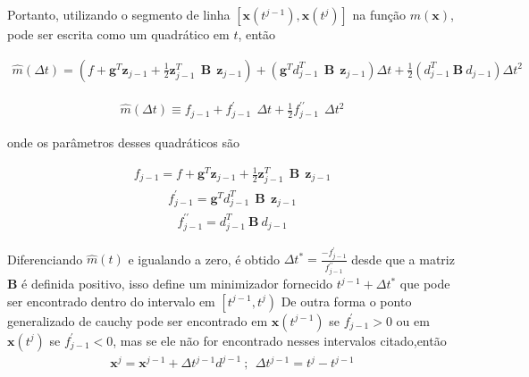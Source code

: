           
          Portanto, utilizando o segmento de linha $\left [ \mathbf{x}\left(t^{j-1}\right),\mathbf{x}\left(t^{j}\right) \right] $ na função $m(\mathbf{x})$, pode ser escrita como um quadrático em $t$, então
          
          \begin{eqnarray}
          \nonumber
          \hat{m}\left(\Delta t\right) = \left(f + \mathbf{g}^{T} \mathbf{z}_{j-1} + \frac{1}{2} \mathbf{z}_{j-1} ^{T}~~\mathbf{B}~~\mathbf{z}_{j-1}\right) + \left(\mathbf{g}^{T} d_{j-1}^T~~\mathbf{B}~~\mathbf{z}_{j-1}\right) \Delta t + \frac{1}{2} \left(d_{j-1}^{T}~\mathbf{B}~d_{j-1}\right) \Delta t^{2}
          \end{eqnarray}

          \begin{eqnarray}
           \hat{m}\left(\Delta t\right) \equiv f_{j-1} + f^{\prime}_{j-1}~~ \Delta t + \frac{1}{2} f^{\prime \prime}_{j-1} ~~\Delta t^{2}
           \end{eqnarray}
 
          onde os parâmetros desses quadráticos são
          
          \begin{eqnarray}
          \nonumber
          f_{j-1} = f + \mathbf{g}^{T} \mathbf{z}_{j-1} + \frac{1}{2} \mathbf{z}_{j-1} ^{T}~~\mathbf{B}~~\mathbf{z}_{j-1}
          \end{eqnarray}
          \begin{eqnarray}
           f^{\prime}_{j-1}=\mathbf{g}^{T} d_{j-1}^T~~\mathbf{B}~~\mathbf{z}_{j-1}
           \label{fprime}
          \end{eqnarray}
          \begin{eqnarray}
          f^{\prime \prime}_{j-1} =d_{j-1}^{T}~\mathbf{B}~d_{j-1}
          \label{f2prime}
          \end{eqnarray}

          
          Diferenciando $\hat{m}(t)$ e igualando a zero, é obtido $\Delta t ^{*} = \frac{-f_{j-1}^{\prime}}{f^{\prime \prime}_{j-1}}$ desde que a matriz $\mathbf{B}$ é definida positivo, isso define um minimizador fornecido $t^{j-1}+ \Delta t^{*}$ que pode ser encontrado dentro do intervalo em $ \left[t^{j-1},\right. \left. t^{j}\right)$ De outra forma o ponto generalizado de cauchy pode ser encontrado em $\mathbf{x}\left(t^{j-1}\right) $ se $f^{\prime}_{j-1} > 0$ ou em $\mathbf{x}\left(t^{j}\right)$ se $f^{\prime}_{j-1}<0$, mas se ele não for encontrado nesses intervalos citado,então
          \begin{eqnarray}
           \mathbf{x}^{j} = \mathbf{x}^{j-1} + \Delta t^{j-1} d^{j-1}~;~~\Delta t^{j-1}= t^{j} - t^{j-1}
           \label{eqx}
          \end{eqnarray}

